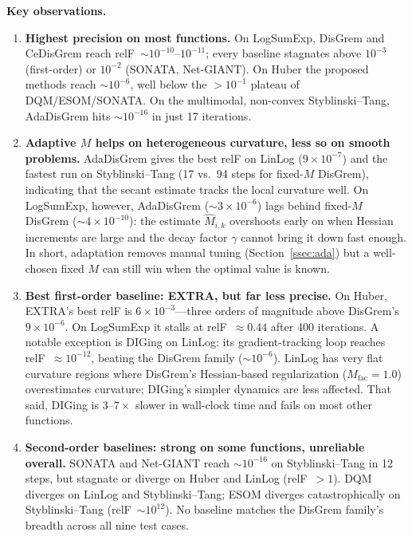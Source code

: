 \documentclass[10pt,twocolumn,letterpaper]{article}
\theoremstyle{compact}
\theoremstyle{compactremark}
\begin{document}
	\noindent\textbf{Key observations.}
	\begin{enumerate}[leftmargin=1.4em,itemsep=2pt]
		\item \textbf{Highest precision on most functions.}
		On LogSumExp, DisGrem and CeDisGrem reach
		relF~$\sim10^{-10}$--$10^{-11}$; every baseline stagnates above
		$10^{-3}$ (first-order) or $10^{-2}$ (SONATA, Net-GIANT).
		On Huber the proposed methods reach $\sim10^{-6}$, well
		below the $>10^{-1}$ plateau of DQM/ESOM/SONATA.
		On the multimodal, non-convex Styblinski--Tang, AdaDisGrem
		hits $\sim10^{-16}$ in just 17 iterations.
		
		\item \textbf{Adaptive $M$ helps on heterogeneous curvature,
			less so on smooth problems.}
		AdaDisGrem gives the best relF on LinLog ($9{\times}10^{-7}$)
		and the fastest run on Styblinski--Tang (17 vs.\ 94 steps for
		fixed-$M$ DisGrem), indicating that the secant estimate
		tracks the local curvature well.
		On LogSumExp, however, AdaDisGrem ($\sim3{\times}10^{-6}$)
		lags behind fixed-$M$ DisGrem ($\sim4{\times}10^{-10}$):
		the estimate $\hat M_{i,k}$ overshoots early on when Hessian
		increments are large and the decay factor $\gamma$ cannot
		bring it down fast enough.
		In short, adaptation removes manual tuning
		(Section~\ref{ssec:ada}) but a well-chosen fixed $M$ can
		still win when the optimal value is known.
		
		\item \textbf{Best first-order baseline: EXTRA, but far less
			precise.}
		On Huber, EXTRA's best relF is $6{\times}10^{-3}$---three
		orders of magnitude above DisGrem's $9{\times}10^{-6}$.
		On LogSumExp it stalls at relF~$\approx0.44$ after 400 iterations.
		A notable exception is DIGing on LinLog: its gradient-tracking
		loop reaches relF~$\approx10^{-12}$, beating the DisGrem
		family ($\sim10^{-6}$).
		LinLog has very flat curvature regions where DisGrem's
		Hessian-based regularization ($M_{\mathrm{fac}}{=}1.0$)
		overestimates curvature; DIGing's simpler dynamics are less
		affected.
		That said, DIGing is $3$--$7\times$ slower in wall-clock time
		and fails on most other functions.
		
		\item \textbf{Second-order baselines: strong on some functions,
			unreliable overall.}
		SONATA and Net-GIANT reach $\sim10^{-16}$ on Styblinski--Tang
		in 12 steps, but stagnate or diverge on Huber and LinLog
		(relF~$>1$).
		DQM diverges on LinLog and Styblinski--Tang; ESOM diverges
		catastrophically on Styblinski--Tang (relF~$\sim10^{12}$).
		No baseline matches the DisGrem family's breadth across all
		nine test cases.
		

\end{enumerate}
\end{document}
